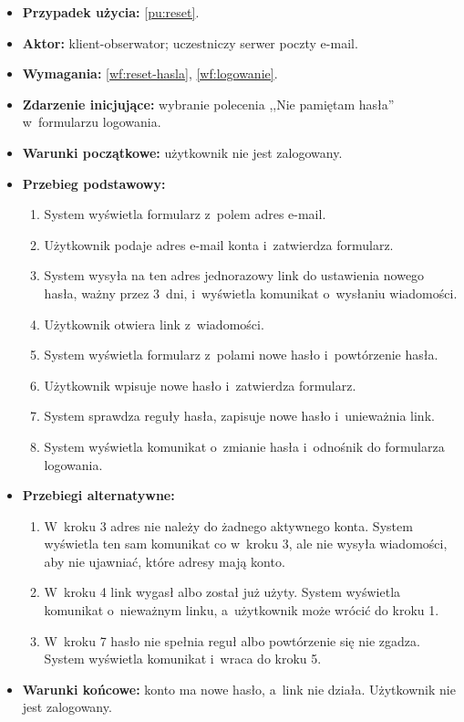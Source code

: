 \documentclass[12pt,a4paper,oneside]{article}
\newcounter{pu}
\begin{document}
\begin{itemize}
	\item \textbf{Przypadek użycia:} \ref{pu:reset}.
	\item \textbf{Aktor:} klient-obserwator; uczestniczy serwer poczty e-mail.
	\item \textbf{Wymagania:} \ref{wf:reset-hasla}, \ref{wf:logowanie}.
	\item \textbf{Zdarzenie inicjujące:} wybranie polecenia ,,Nie pamiętam hasła'' w~formularzu logowania.
	\item \textbf{Warunki początkowe:} użytkownik nie jest zalogowany.
	\item \textbf{Przebieg podstawowy:}
	\begin{enumerate}
		\item System wyświetla formularz z~polem adres e-mail.
		\item Użytkownik podaje adres e-mail konta i~zatwierdza formularz.
		\item System wysyła na ten adres jednorazowy link do ustawienia nowego hasła, ważny przez 3~dni, i~wyświetla komunikat o~wysłaniu wiadomości.
		\item Użytkownik otwiera link z~wiadomości.
		\item System wyświetla formularz z~polami nowe hasło i~powtórzenie hasła.
		\item Użytkownik wpisuje nowe hasło i~zatwierdza formularz.
		\item System sprawdza reguły hasła, zapisuje nowe hasło i~unieważnia link.
		\item System wyświetla komunikat o~zmianie hasła i~odnośnik do formularza logowania.
	\end{enumerate}
	\item \textbf{Przebiegi alternatywne:}
	\begin{enumerate}[label=A\arabic*.]
		\item W~kroku 3 adres nie należy do żadnego aktywnego konta. System wyświetla ten sam komunikat co w~kroku 3, ale nie wysyła wiadomości, aby nie ujawniać, które adresy mają konto.
		\item W~kroku 4 link wygasł albo został już użyty. System wyświetla komunikat o~nieważnym linku, a~użytkownik może wrócić do kroku 1.
		\item W~kroku 7 hasło nie spełnia reguł albo powtórzenie się nie zgadza. System wyświetla komunikat i~wraca do kroku 5.
	\end{enumerate}
	\item \textbf{Warunki końcowe:} konto ma nowe hasło, a~link nie działa. Użytkownik nie jest zalogowany.
\end{itemize}
\end{document}
